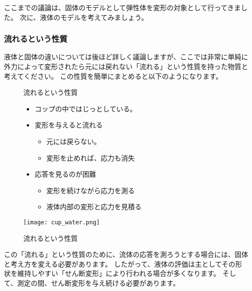 \documentclass[uplatex,dvipdfmx,a4paper,11pt]{jsreport}
\begin{document}
ここまでの議論は、固体のモデルとして弾性体を変形の対象として行ってきました。
次に、液体のモデルを考えてみましょう。

\subsubsection{流れるという性質}
液体と固体の違いについては後ほど詳しく議論しますが、ここでは非常に単純に外力によって変形されたら元には戻れない「流れる」という性質を持った物質と考えてください。
この性質を簡単にまとめると以下のようになります。
\begin{figure}[htb]
	\begin{center}
		\begin{minipage}{0.55\textwidth}
			\large
			\begin{itembox}[l]{流れるという性質}
				\begin{itemize}
					\item コップの中ではじっとしている。
					\item 変形を与えると流れる
					\begin{itemize}
						\item 元には戻らない。
						\item 変形を止めれば、応力も消失
					\end{itemize}
					\item 応答を見るのが困難
					\begin{itemize}
						\item 変形を続けながら応力を測る
						\item 液体内部の変形と応力を見積る
					\end{itemize}
				\end{itemize}
			\end{itembox}
		\end{minipage}
		\begin{minipage}{0.35\textwidth}
			\begin{center}
			\texttt{[image: cup\_water.png]}
			\end{center}
		\end{minipage}
		\caption{流れるという性質}
		\label{fig:flow}
	\end{center}
\end{figure}

この「流れる」という性質のために、流体の応答を測ろうとする場合には、固体と考え方を変える必要があります。
したがって、液体の評価は主としてその形状を維持しやすい「せん断変形」により行われる場合が多くなります。
そして、測定の間、せん断変形を与え続ける必要があります。
\end{document}
